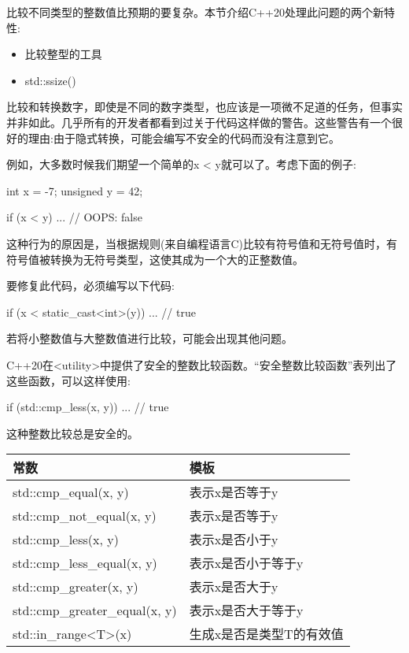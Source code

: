 
比较不同类型的整数值比预期的要复杂。本节介绍C++20处理此问题的两个新特性:

\begin{itemize}
\item
比较整型的工具

\item
std::ssize()
\end{itemize}


比较和转换数字，即使是不同的数字类型，也应该是一项微不足道的任务，但事实并非如此。几乎所有的开发者都看到过关于代码这样做的警告。这些警告有一个很好的理由:由于隐式转换，可能会编写不安全的代码而没有注意到它。

例如，大多数时候我们期望一个简单的x < y就可以了。考虑下面的例子:

\begin{cpp}
int x = -7;
unsigned y = 42;

if (x < y) ... // OOPS: false
\end{cpp}

这种行为的原因是，当根据规则(来自编程语言C)比较有符号值和无符号值时，有符号值被转换为无符号类型，这使其成为一个大的正整数值。

要修复此代码，必须编写以下代码:

\begin{cpp}
if (x < static_cast<int>(y)) ... // true
\end{cpp}

若将小整数值与大整数值进行比较，可能会出现其他问题。

C++20在<utility>中提供了安全的整数比较函数。“安全整数比较函数”表列出了这些函数，可以这样使用:

\begin{cpp}
if (std::cmp_less(x, y)) ... // true
\end{cpp}

这种整数比较总是安全的。

\begin{longtable}[c]{|l|l|}
\hline
\textbf{常数}          & \textbf{模板}                  \\ \hline
\endfirsthead
%
\endhead
%
std::cmp\_equal(x, y)      & 表示x是否等于y     \\ \hline
std::cmp\_not\_equal(x, y) & 表示x是否等于y \\ \hline
std::cmp\_less(x, y)       & 表示x是否小于y    \\ \hline
std::cmp\_less\_equal(x, y)                 & 表示x是否小于等于y    \\ \hline
std::cmp\_greater(x, y)    & 表示x是否大于y \\ \hline
std::cmp\_greater\_equal(x, y)              & 表示x是否大于等于y \\ \hline
std::in\_range\textless{}T\textgreater{}(x) & 生成x是否是类型T的有效值   \\ \hline
\end{longtable}

